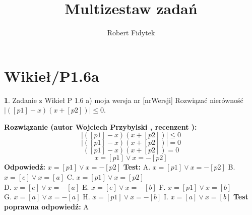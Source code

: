 \documentclass[12pt, a4paper]{article}
\title{Multizestaw zadań}
\author{Robert Fidytek}
\date{}
\theoremstyle{definition} %
\newtheorem{zad}{}
\newcommand{\kategoria}[1]{\section{#1}} %
\newcommand{\zadStart}[1]{\begin{zad}#1\newline} %
\newcommand{\zadStop}{\end{zad}}   %
\newcommand{\rozwStart}[2]{\noindent \textbf{Rozwiązanie (autor #1 , recenzent #2): }\newline} %
\newcommand{\rozwStop}{\newline}                                            %
\newcommand{\odpStart}{\noindent \textbf{Odpowiedź:}\newline}    %
\newcommand{\odpStop}{\newline}                                             %
\newcommand{\testStart}{\noindent \textbf{Test:}\newline} %
\newcommand{\testStop}{\newline} %
\newcommand{\kluczStart}{\noindent \textbf{Test poprawna odpowiedź:}\newline} %
\newcommand{\kluczStop}{\newline} %
\begin{document}
\maketitle


\kategoria{Wikieł/P1.6a}
\zadStart{Zadanie z Wikieł P 1.6 a) moja wersja nr [nrWersji]}
Rozwiązać nierówność $|([p1]-x)(x+[p2])| \leq 0$.
\zadStop
\rozwStart{Wojciech Przybylski}{}
$$|([p1]-x)(x+[p2])| \leq 0$$ 
$$|([p1]-x)(x+[p2])| = 0$$ 
$$([p1]-x)(x+[p2]) = 0$$ 
$$x = [p1] \vee x = -[p2] $$ 
\rozwStop
\odpStart
$x = [p1]\vee x = -[p2] $
\odpStop
\testStart
A. $x = [p1]\vee x = -[p2] $
B. $x = [e]\vee x = [a] $
C. $x = [p1]\vee x = [p2]$\\
D. $x = [e]\vee x = -[a] $
E. $x = [e]\vee x = -[b] $
F. $x = [p1]\vee x = [b] $\\
G. $x = [a]\vee x = -[a] $
H. $x = [p1]\vee x = -[b] $
I. $x = [a]\vee x = [b] $
\testStop
\kluczStart
A
\kluczStop
\end{document}
